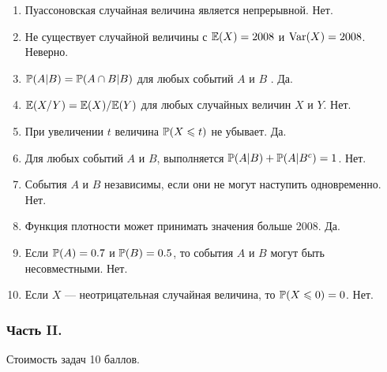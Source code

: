 \begin{enumerate}
\item Пуассоновская случайная величина является непрерывной. Нет.
\item Не существует случайной величины с $\E(X)=2008$ и $\Var(X)=2008$. Неверно.
\item $\P(A|B)=\P(A\cap B|B)$ для любых событий $A$ и $B$ . Да.
\item $\E(X/Y)=\E(X)/\E(Y)$ для любых случайных величин $X$ и $Y$. Нет.
\item При увеличении $t$ величина $\P(X\le t)$ не убывает. Да.
\item Для любых событий $A$ и $B$, выполняется $\P(A|B)+\P(A|B^{c})=1$. Нет.
\item События $A$ и $B$ независимы, если они не могут наступить одновременно. Нет.
\item Функция плотности может принимать значения больше 2008. Да.
\item Если $\P(A)=0.7$ и $\P(B)=0.5$, то события $A$ и $B$ могут быть несовместными. Нет.
\item Если $X$ — неотрицательная случайная величина, то $\P(X\le 0)=0$. Нет.
\end{enumerate}

\subsubsection*{Часть II.}

Стоимость задач 10 баллов.



